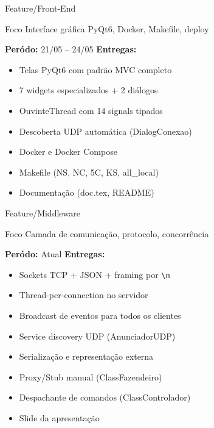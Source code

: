 \documentclass[aspectratio=169]{beamer}
\begin{document}
\begin{frame}{Feature/Front-End}
  \begin{block}{Foco}
    Interface gr\'afica PyQt6, Docker, Makefile, deploy
  \end{block}
  \vfill
  \textbf{Per\'odo:} 21/05 -- 24/05
  \vfill
  \textbf{Entregas:}
  \begin{itemize}
    \item Telas PyQt6 com padr\~ao MVC completo
    \item 7 widgets especializados + 2 di\'alogos
    \item OuvinteThread com 14 signals tipados
    \item Descoberta UDP autom\'atica (DialogConexao)
    \item Docker e Docker Compose
    \item Makefile (NS, NC, 5C, KS, all\_local)
    \item Documenta\c{c}\~ao (doc.tex, README)
  \end{itemize}
\end{frame}

\begin{frame}{Feature/Middleware}
  \begin{block}{Foco}
    Camada de comunica\c{c}\~ao, protocolo, concorr\^encia
  \end{block}
  \vfill
  \textbf{Per\'odo:} Atual
  \vfill
  \textbf{Entregas:}
  \begin{itemize}
    \item Sockets TCP + JSON + framing por \texttt{\textbackslash n}
    \item Thread-per-connection no servidor
    \item Broadcast de eventos para todos os clientes
    \item Service discovery UDP (AnunciadorUDP)
    \item Serializa\c{c}\~ao e representa\c{c}\~ao externa
    \item Proxy/Stub manual (ClassFazendeiro)
    \item Despachante de comandos (ClassControlador)
    \item Slide da apresenta\c{c}\~ao
  \end{itemize}
\end{frame}
\end{document}
